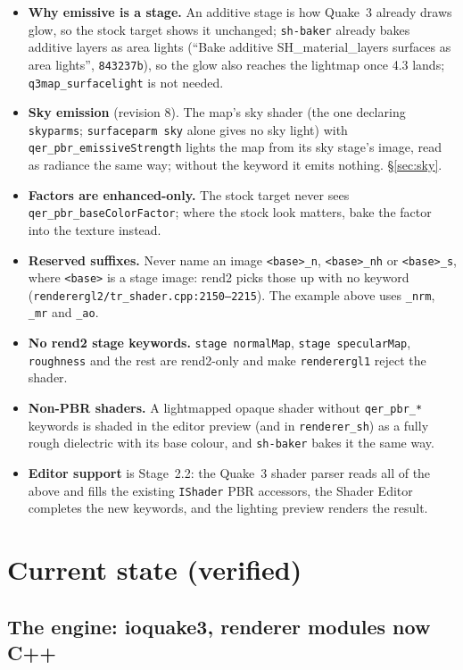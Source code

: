 \documentclass[11pt,a4paper]{article}
\begin{document}
\begin{itemize}
\item \textbf{Why emissive is a stage.} An additive stage is how Quake~3 already draws glow, so the
  stock target shows it unchanged; \texttt{sh-baker} already bakes additive layers as area lights
  (``Bake additive SH\_material\_layers surfaces as area lights'', \texttt{843237b}), so the glow
  also reaches the lightmap once 4.3 lands; \texttt{q3map\_surfacelight} is not needed.
\item \textbf{Sky emission} (revision 8). The map's sky shader (the one declaring \texttt{skyparms};
  \texttt{surfaceparm sky} alone gives no sky light) with \texttt{qer\_pbr\_emissiveStrength} lights
  the map from its sky stage's image, read as radiance the same way; without the keyword it emits
  nothing. §\ref{sec:sky}.
\item \textbf{Factors are enhanced-only.} The stock target never sees \texttt{qer\_pbr\_baseColorFactor};
  where the stock look matters, bake the factor into the texture instead.
\item \textbf{Reserved suffixes.} Never name an image \texttt{<base>\_n}, \texttt{<base>\_nh} or
  \texttt{<base>\_s}, where \texttt{<base>} is a stage image: rend2 picks those up with no keyword
  (\texttt{renderergl2/tr\_shader.cpp:2150--2215}). The example above uses \texttt{\_nrm},
  \texttt{\_mr} and \texttt{\_ao}.
\item \textbf{No rend2 stage keywords.} \texttt{stage normalMap}, \texttt{stage specularMap},
  \texttt{roughness} and the rest are rend2-only and make \texttt{renderergl1} reject the shader.
\item \textbf{Non-PBR shaders.} A lightmapped opaque shader without \texttt{qer\_pbr\_*} keywords
  is shaded in the editor preview (and in \texttt{renderer\_sh}) as a fully rough dielectric with
  its base colour, and \texttt{sh-baker} bakes it the same way.
\item \textbf{Editor support} is Stage~2.2: the Quake~3 shader parser reads all of the above and
  fills the existing \texttt{IShader} PBR accessors, the Shader Editor completes the new keywords,
  and the lighting preview renders the result.
\end{itemize}

\section{Current state (verified)}

\subsection{The engine: ioquake3, renderer modules now C++}\label{sec:rend2facts}
\end{document}
